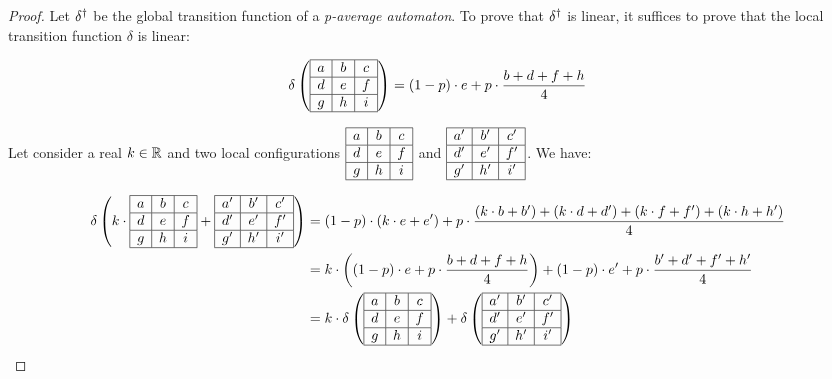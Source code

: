 \begin{proof}
 Let $\delta^{\dag}$ be the global transition function of a \textit{p-average automaton}. To prove that $\delta^{\dag}$ is linear, it suffices to prove that the local transition function $\delta$ is linear:
 
 \[ \delta \left( \begin{array}{ | c | c | c |} \hline
  a & b & c \\ \hline
  d & e & f \\ \hline
  g & h & i \\ \hline
 \end{array} \right) = (1-p) \cdot e+p \cdot \frac{b+d+f+h}{4}\]
 
 Let consider a real $k \in \mathbb{R}$ and two local configurations $\begin{array}{ | c | c | c |} \hline
  a & b & c \\ \hline
  d & e & f \\ \hline
  g & h & i \\ \hline
 \end{array}$ and $\begin{array}{ | c | c | c |} \hline
  a' & b' & c' \\ \hline
  d' & e' & f' \\ \hline
  g' & h' & i' \\ \hline
 \end{array}$. We have:
 
 \[\begin{split}
 \delta \left( k \cdot \begin{array}{ | c | c | c |} \hline
  a & b & c \\ \hline
  d & e & f \\ \hline
  g & h & i \\ \hline
 \end{array} + \begin{array}{ | c | c | c |} \hline
  a' & b' & c' \\ \hline
  d' & e' & f' \\ \hline
  g' & h' & i' \\ \hline
 \end{array} \right) & = (1-p) \cdot (k \cdot e+e') + p \cdot \frac{(k \cdot b+b')+(k \cdot d+d')+(k \cdot f+f')+(k \cdot h+h')}{4}  \\
		     & = k \cdot \left( (1-p) \cdot e+p \cdot \frac{b+d+f+h}{4} \right) + (1-p) \cdot e'+p \cdot \frac{b'+d'+f'+h'}{4} \\
		     & = k \cdot \delta \left( \begin{array}{ | c | c | c |} \hline
  a & b & c \\ \hline
  d & e & f \\ \hline
  g & h & i \\ \hline
 \end{array} \right) + \delta \left( \begin{array}{ | c | c | c |} \hline
  a' & b' & c' \\ \hline
  d' & e' & f' \\ \hline
  g' & h' & i' \\ \hline
 \end{array} \right)      
 \end{split}\]
 

\end{proof}
